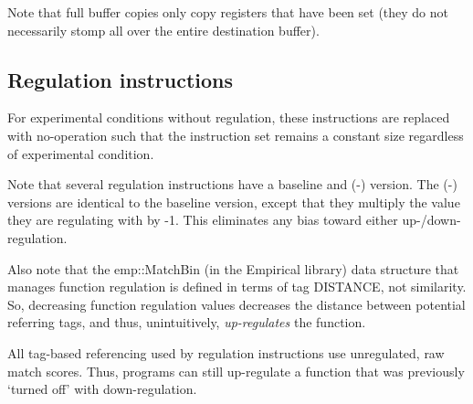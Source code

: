 \documentclass[]{book}
\begin{document}
Note that full buffer copies only copy registers that have been set (they do not necessarily stomp all over the entire destination buffer).

\hypertarget{regulation-instructions}{%
\subsection{Regulation instructions}\label{regulation-instructions}}

For experimental conditions without regulation, these instructions are replaced with no-operation
such that the instruction set remains a constant size regardless of experimental condition.

Note that several regulation instructions have a baseline and (-) version.
The (-) versions are identical to the baseline version, except that they multiply the value they are
regulating with by -1. This eliminates any bias toward either up-/down-regulation.

Also note that the emp::MatchBin (in the Empirical library) data structure that manages function regulation
is defined in terms of tag DISTANCE, not similarity. So, decreasing function regulation values decreases
the distance between potential referring tags, and thus, unintuitively, \emph{up-regulates} the function.

All tag-based referencing used by regulation instructions use unregulated, raw match scores. Thus, programs
can still up-regulate a function that was previously `turned off' with down-regulation.
\end{document}
